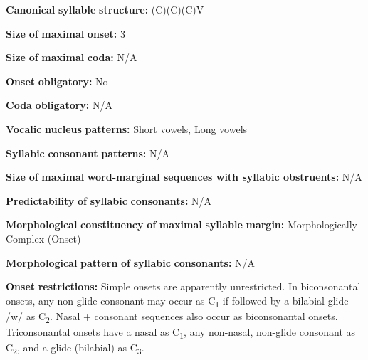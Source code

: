 \documentclass[output=paper]{langsci/langscibook}
\begin{document}
\begin{styleBody}
\textbf{Canonical} \textbf{syllable} \textbf{structure:} (C)(C)(C)V \citep[20-21]{Kawasha2003}
\end{styleBody}

\begin{styleBody}
\textbf{Size} \textbf{of} \textbf{maximal} \textbf{onset:} 3
\end{styleBody}

\begin{styleBody}
\textbf{Size} \textbf{of} \textbf{maximal} \textbf{coda:} N/A
\end{styleBody}

\begin{styleBody}
\textbf{Onset} \textbf{obligatory:} No
\end{styleBody}

\begin{styleBody}
\textbf{Coda} \textbf{obligatory:} N/A
\end{styleBody}

\begin{styleBody}
\textbf{Vocalic} \textbf{nucleus} \textbf{patterns:} Short vowels, Long vowels
\end{styleBody}

\begin{styleBody}
\textbf{Syllabic} \textbf{consonant} \textbf{patterns:} N/A
\end{styleBody}

\begin{styleBody}
\textbf{Size} \textbf{of} \textbf{maximal} \textbf{word{}-marginal sequences with syllabic obstruents:} N/A
\end{styleBody}

\begin{styleBody}
\textbf{Predictability} \textbf{of} \textbf{syllabic} \textbf{consonants:} N/A
\end{styleBody}

\begin{styleBody}
\textbf{Morphological} \textbf{constituency} \textbf{of} \textbf{maximal} \textbf{syllable} \textbf{margin:} Morphologically Complex (Onset)
\end{styleBody}

\begin{styleBody}
\textbf{Morphological} \textbf{pattern} \textbf{of} \textbf{syllabic} \textbf{consonants:} N/A
\end{styleBody}

\begin{styleBody}
\textbf{Onset} \textbf{restrictions:} Simple onsets are apparently unrestricted. In biconsonantal onsets, any non-glide consonant may occur as C\textsubscript{1} if followed by a bilabial glide /w/ as C\textsubscript{2}. Nasal + consonant sequences also occur as biconsonantal onsets. Triconsonantal onsets have a nasal as C\textsubscript{1}, any non-nasal, non-glide consonant as C\textsubscript{2}, and a glide (bilabial) as C\textsubscript{3}.
\end{styleBody}
\end{document}
